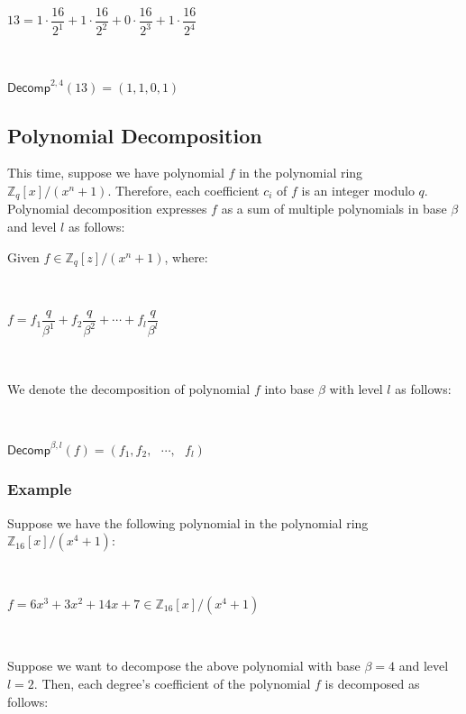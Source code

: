 $ $

$13 = 1 \cdot \dfrac{16}{2^1} + 1 \cdot \dfrac{16}{2^2} + 0 \cdot \dfrac{16}{2^3} + 1 \cdot \dfrac{16}{2^4}$

$ $

$\textsf{Decomp}^{2, 4}(13) = (1, 1, 0, 1)$


\subsection{Polynomial Decomposition}
\label{subsec:poly-decomp}

This time, suppose we have polynomial $f$ in the polynomial ring ${\mathbb{Z}_q[x] / (x^n + 1)}$. Therefore, each coefficient $c_i$ of $f$ is an integer modulo $q$. Polynomial decomposition expresses $f$ as a sum of multiple polynomials in base $\beta$ and level $l$ as follows:


\begin{tcolorbox}[title={\textbf{\tboxlabel{\ref*{subsec:poly-decomp}} Polynomial Decomposition}}]

Given $f \in \mathbb{Z}_q[z]/(x^n+1)$, where:

$ $

$f = f_1 \dfrac{q}{\beta^1} + f _2\dfrac{q}{\beta^2} + \cdots + f_l \dfrac{q}{\beta^l}  $

$ $

We denote the decomposition of polynomial $f$ into base $\beta$ with level $l$ as follows:

$ $

$\textsf{Decomp}^{\beta, l}(f) = (f_1, f_2, \text{ } \cdots , \text{ } f_l)$
 $ $
\end{tcolorbox}




\subsubsection{Example}

Suppose we have the following polynomial in the polynomial ring $\mathbb{Z}_{16}[x] / (x^4 + 1)$:

$ $

$f = 6x^3 + 3x^2 + 14x + 7 \in \mathbb{Z}_{16}[x] / (x^4 + 1)$

$ $

Suppose we want to decompose the above polynomial with base $\beta = 4$ and level $l = 2$. Then, each degree's coefficient of the polynomial $f$ is decomposed as follows:

$ $

